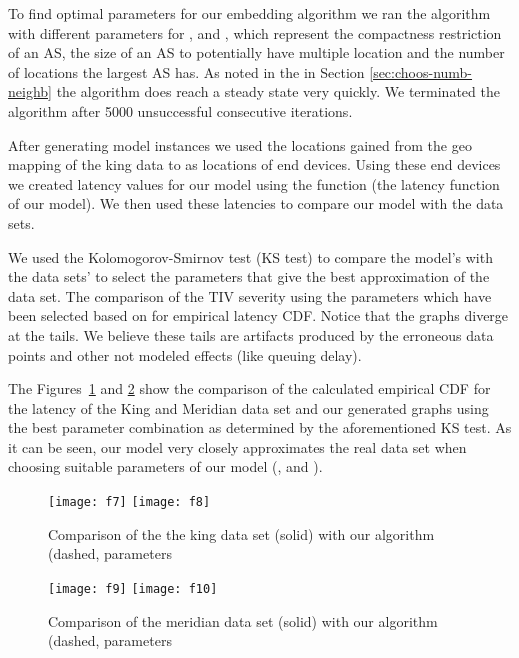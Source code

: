 \documentclass{sig-alternate-10pt}
\begin{document}
\begin{enumerate}
To find optimal parameters for our embedding algorithm we ran the algorithm with different parameters for ,  and , which represent the compactness restriction of an AS, the size of an AS to potentially have multiple location and the number of locations the largest AS has. 
As noted in the in Section \ref{sec:choos-numb-neighb} the algorithm does reach a steady state very quickly. We terminated the algorithm after 5000 unsuccessful consecutive iterations. 

After generating model instances we used the locations gained from the geo mapping of the king data to as locations of end devices. Using these end devices we created latency values for our model using the function  (the latency function of our model). We then used these latencies to compare our model with the data sets.

We used the  Kolomogorov-Smirnov test (KS test) to compare the model's  with the data sets'  to select the parameters that give the best approximation of the data set. 
The comparison of the TIV severity using the parameters which have been selected based on for empirical latency CDF. Notice that the graphs diverge at the tails. We believe these tails are artifacts produced by the erroneous data points and other not modeled effects (like queuing delay).

The Figures~\ref{compcdf} and \ref{compcdfmeri} show the comparison of the calculated empirical CDF for the latency of the King and Meridian data set and our generated graphs using the best parameter combination as determined by the aforementioned KS test. As it can be seen, our model very closely approximates the real data set when choosing suitable parameters of our model (,  and ). 


\begin{figure}

\texttt{[image: f7]}
\texttt{[image: f8]}

\caption{Comparison of the the king data set (solid) with our algorithm (dashed, parameters }
\label{compcdf}
\end{figure}

\begin{figure}

\texttt{[image: f9]}
\texttt{[image: f10]}

\caption{Comparison of the meridian data set (solid) with our algorithm (dashed, parameters }
\label{compcdfmeri}
\end{figure}












\end{enumerate}
\end{document}
